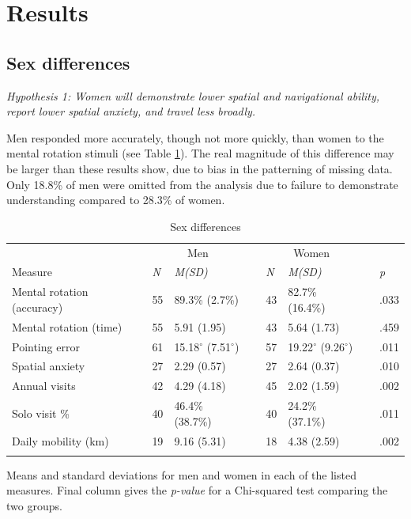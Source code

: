 \section{Results}
\label{sec:3}
	\subsection{Sex differences}
	\label{sec:3.1}
	
\emph{Hypothesis 1: Women will demonstrate lower spatial and navigational ability, report lower spatial anxiety, and travel less broadly.}	
\smallskip

Men responded more accurately, though not more quickly, than women to the mental rotation stimuli (see Table \ref{tab:sex}).  The real magnitude of this difference may be larger than these results show, due to bias in the patterning of missing data.  Only 18.8\% of men were omitted from the analysis due to failure to demonstrate understanding compared to 28.3\% of women.

\begin{table}[h!]
\caption{Sex differences}
\label{tab:sex}  
\begin{tabular}{llllllll}
\hline\noalign{\smallskip}
& \multicolumn{2}{c}{Men} && \multicolumn{2}{c}{Women} && \\
Measure & \emph{N} & \emph{M(SD)} && \emph{N} & \emph{M(SD)} && \emph{p} \\
\noalign{\smallskip}\hline\noalign{\smallskip}
Mental rotation (accuracy) & 55 & 89.3\% (2.7\%) && 43 & 82.7\% (16.4\%) && .033 \\
Mental rotation (time) & 55 & 5.91 (1.95) && 43 & 5.64 (1.73) && .459 \\
Pointing error & 61 & 15.18$^{\circ}$ (7.51$^{\circ}$) && 57 & 19.22$^{\circ}$ (9.26$^{\circ}$) && .011 \\
Spatial anxiety & 27 & 2.29 (0.57) && 27 & 2.64 (0.37) && .010 \\
Annual visits & 42 & 4.29 (4.18) && 45 & 2.02 (1.59) && .002 \\
Solo visit \% & 40 & 46.4\% (38.7\%) && 40 & 24.2\% (37.1\%) && .011 \\
Daily mobility (km) & 19 & 9.16 (5.31) && 18 & 4.38 (2.59) && .002 \\
\noalign{\smallskip}\hline
\end{tabular}\par
\bigskip
Means and standard deviations for men and women in each of the listed measures. Final column gives the \emph{p-value} for a Chi-squared test comparing the two groups. 
\end{table}		  

